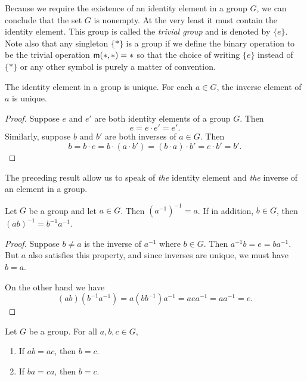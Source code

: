 Because we require the existence of an identity element in a group \(G\), we can
conclude that the set \(G\) is nonempty. At the very least it must contain the
identity element. This group is called the \emph{trivial group} and is denoted
by \(\{e\}\). Note also that any singleton \(\{*\}\) is a group if we define the
binary operation to be the trivial operation \({\mathsf{m}}(*, *) = *\) so that the
choice of writing \(\{e\}\) instead of \(\{*\}\) or any other symbol is purely a
matter of convention.

\begin{theorem}
    The identity element in a group is unique. For each \(a \in G\), the inverse
    element of \(a\) is unique.
\end{theorem}

\begin{proof}
    Suppose \(e\) and \(e'\) are both identity elements of a group \(G\). Then
    \[
        e = e \cdot e' = e'.
    \]
    Similarly, suppose \(b\) and \(b'\) are both inverses of \(a \in G\). Then
    \[
        b = b \cdot e = b \cdot (a \cdot b') = (b \cdot a) \cdot b' = e \cdot b' = b'.
    \]
\end{proof}


The preceding result allow us to speak of \emph{the} identity element and
\emph{the} inverse of an element in a group.

\begin{theorem}
    Let \(G\) be a group and let \(a \in G\). Then \((a^{-1})^{-1} = a\). If in
    addition, \(b \in G\), then \((ab)^{-1} = b^{-1}a^{-1}\).
\end{theorem}

\begin{proof}
    Suppose \(b \neq a\) is the inverse of \(a^{-1}\) where \(b \in G\). Then
    \(a^{-1}b = e = ba^{-1}\). But \(a\) also satisfies this property, and since
    inverses are unique, we must have \(b = a\).

    On the other hand we have
    \[
        (ab)(b^{-1}a^{-1}) = a(bb^{-1})a^{-1} = aea^{-1} = aa^{-1} = e.
    \]
\end{proof}


\begin{theorem}
    Let \(G\) be a group. For all \(a, b, c \in G\),
    \begin{enumerate}
        \item If \(ab = ac\), then \(b = c\).
        \item If \(ba = ca\), then \(b = c\).
    \end{enumerate}
\end{theorem}

